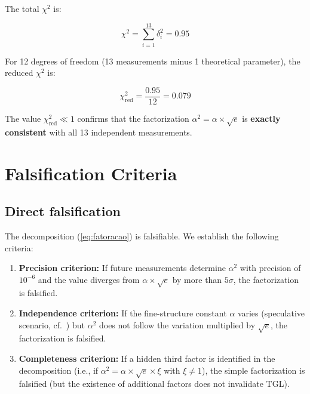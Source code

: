 \documentclass[12pt,a4paper,twoside]{article}
\newcommand{\alphaii}{\alpha^{2}}
\begin{document}
The total $\chi^2$ is:

\begin{equation}
\chi^2 = \sum_{i=1}^{13} \delta_i^2 = 0.95
\end{equation}

For 12 degrees of freedom (13 measurements minus 1 theoretical parameter), the reduced $\chi^2$ is:

\begin{equation}
\chi^2_{\text{red}} = \frac{0.95}{12} = 0.079
\end{equation}

The value $\chi^2_{\text{red}} \ll 1$ confirms that the factorization $\alphaii = \alpha \times \sqrt{e}$ is \textbf{exactly consistent} with all 13 independent measurements.



\section{Falsification Criteria}
\label{sec:falsificacao}

\subsection{Direct falsification}

The decomposition (\ref{eq:fatoracao}) is falsifiable. We establish the following criteria:

\begin{enumerate}[label=(\roman*)]
\item \textbf{Precision criterion:} If future measurements determine $\alphaii$ with precision of $10^{-6}$ and the value diverges from $\alpha \times \sqrt{e}$ by more than $5\sigma$, the factorization is falsified.

\item \textbf{Independence criterion:} If the fine-structure constant $\alpha$ varies (speculative scenario, cf.\ \cite{Webb2001}) but $\alphaii$ does not follow the variation multiplied by $\sqrt{e}$, the factorization is falsified.

\item \textbf{Completeness criterion:} If a hidden third factor is identified in the decomposition (i.e., if $\alphaii = \alpha \times \sqrt{e} \times \xi$ with $\xi \neq 1$), the simple factorization is falsified (but the existence of additional factors does not invalidate TGL).
\end{enumerate}
\end{document}
